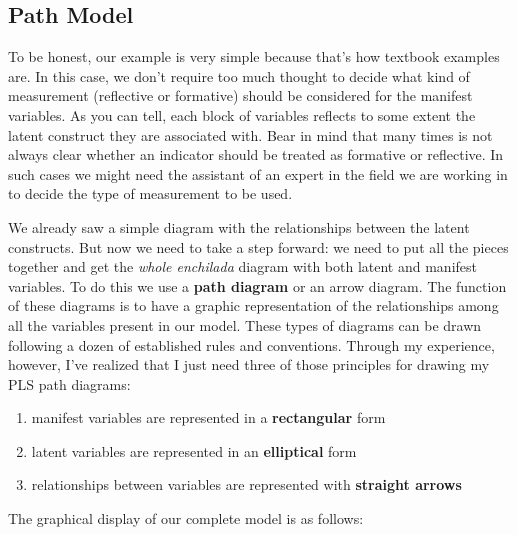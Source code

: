 \documentclass[12pt]{book}\usepackage{graphicx, color}
\begin{document}
\subsection{Path Model}
To be honest, our example is very simple because that's how textbook examples are. In this case, we don't require too much thought to decide what kind of measurement (reflective or formative) should be considered for the manifest variables. As you can tell, each block of variables reflects to some extent the latent construct they are associated with. Bear in mind that many times is not always clear whether an indicator should be treated as formative or reflective. In such cases we might need the assistant of an expert in the field we are working in to decide the type of measurement to be used.

We already saw a simple diagram with the relationships between the latent constructs. But now we need to take a step forward: we need to put all the pieces together and get the \textit{whole enchilada} diagram with both latent and manifest variables. To do this we use a \textbf{path diagram} or an arrow diagram. The function of these diagrams is to have a graphic representation of the relationships among all the variables present in our model. These types of diagrams can be drawn following a dozen of established rules and conventions. Through my experience, however, I've realized that I just need three of those principles for drawing my PLS path diagrams: 
\begin{enumerate}
 \item manifest variables are represented in a \textbf{rectangular} form
 \item latent variables are represented in an \textbf{elliptical} form
 \item relationships between variables are represented with \textbf{straight arrows}
\end{enumerate}
The graphical display of our complete model is as follows:
\end{document}
